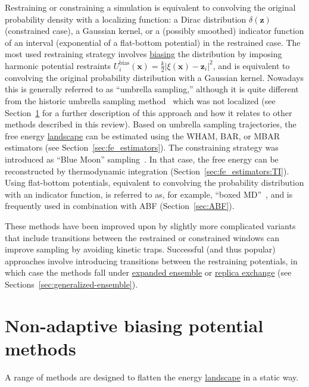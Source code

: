 \documentclass[9pt,review]{livecoms}
\newcommand{\vx}{\mathbf{x}}
\newcommand{\vz}{\mathbf{z}}
\begin{document}
Restraining or constraining a simulation is equivalent
to convolving the original probability density with a localizing function: a Dirac distribution $\delta(\vz)$ (constrained case),
a Gaussian kernel, or a (possibly smoothed) indicator function of an interval (exponential of a flat-bottom potential) in the restrained case.
The most used restraining strategy involves \hyperlink{ref:biasingE} {biasing} the distribution by imposing harmonic potential restraints $U^{\mathrm{bias}}_i(\vx) = \frac{k}{2} |\xi(\vx)-\vz_i|^2$, and is equivalent to convolving the original probability distribution with a Gaussian kernel.
Nowadays this is generally referred to as ``umbrella sampling,'' although it is quite different from the historic umbrella sampling method~\cite{TORRIE1977187} which was not localized (see Section~\ref{sec:biasing_potential} for a further description of this approach and how it relates to other methods described in this review).
Based on umbrella sampling trajectories, the free energy \hyperlink{ref:FES} {landscape} can be estimated using the WHAM, BAR, or MBAR estimators (see Section~\ref{sec:fe_estimators}). The constraining strategy was introduced as ``Blue Moon'' sampling~\cite{doi:10.1080/0892702042000270214}. In that case, the free energy can be reconstructed by thermodynamic integration (Section~\ref{sec:fe_estimators:TI}). Using flat-bottom potentials, equivalent to convolving the probability distribution with an indicator function, is referred to as, for example, ``boxed MD''~\cite{doi:10.1021/jp9074898}, and is frequently used in combination with ABF (Section~\ref{sec:ABF}).

These methods have been improved upon by slightly more complicated variants that include transitions between the restrained or constrained windows can improve sampling by avoiding kinetic traps. Successful (and thus popular) approaches involve introducing transitions between the restraining potentials, in which case the methods fall under \hyperlink{ref:ExpEns} {expanded ensemble} or \hyperlink{ref:ReplEx} {replica exchange} (see Sections~\ref{sec:generalized-ensemble}).


\section{Non-adaptive biasing potential methods}
\label{sec:biasing_potential}

A range of methods are designed to flatten the energy \hyperlink{ref:FES} {landscape} in a static way.
\end{document}
